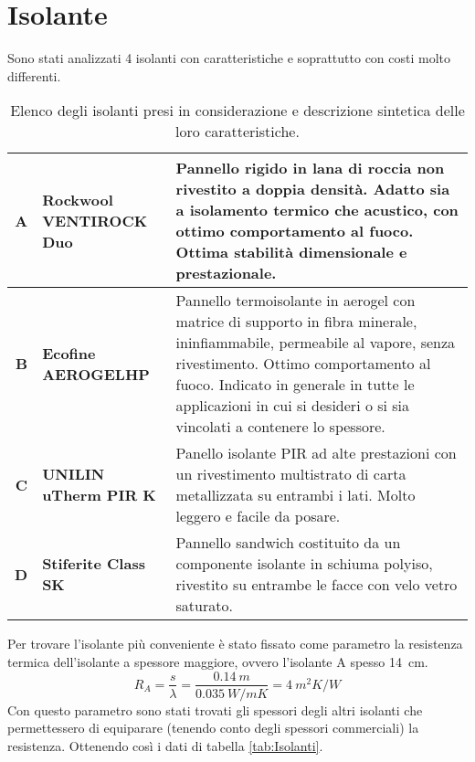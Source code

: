 \section{Isolante}
Sono stati analizzati 4 isolanti con caratteristiche e soprattutto con costi molto differenti.
\begin{table}[H]
\caption{Elenco degli isolanti presi in considerazione e descrizione sintetica delle loro caratteristiche.}
\centering
\begin{tabularx}{\textwidth}{rXX}
    \toprule
        \textbf{A} & \textbf{Rockwool VENTIROCK Duo} & Pannello rigido in lana di roccia non rivestito a doppia densità. 
        Adatto sia a isolamento termico che acustico, con ottimo comportamento al fuoco. 
        Ottima stabilità dimensionale e prestazionale. \\\midrule
        \textbf{B} & \textbf{Ecofine AEROGELHP} & Pannello termoisolante in aerogel con matrice di supporto in fibra minerale, ininfiammabile, permeabile al vapore, senza rivestimento. 
        Ottimo comportamento al fuoco. 
        Indicato in generale in tutte le applicazioni in cui si desideri o si sia vincolati a contenere lo spessore.\\\midrule
        \textbf{C} & \textbf{UNILIN uTherm PIR K} & Panello isolante PIR ad alte prestazioni con un rivestimento multistrato di carta metallizzata su entrambi i lati. 
        Molto leggero e facile da posare.\\\midrule
        \textbf{D} & \textbf{Stiferite Class SK} & Pannello sandwich costituito da un componente isolante in schiuma polyiso, rivestito su entrambe le facce con velo vetro saturato.\\
    \bottomrule
\end{tabularx}
\end{table}
Per trovare l'isolante più conveniente è stato fissato come parametro la resistenza termica dell'isolante a spessore maggiore, ovvero l'isolante A spesso \SI{14}{\centi\metre}.
\[R_A = \frac{s}{\lambda}=\frac{\SI{0.14}{m}}{\SI{0.035}{W/mK}}=\SI{4}{m^2K\per W}\]
Con questo parametro sono stati trovati gli spessori degli altri isolanti che permettessero di equiparare (tenendo conto degli spessori commerciali) la resistenza. 
Ottenendo così i dati di tabella \ref{tab:Isolanti}.
